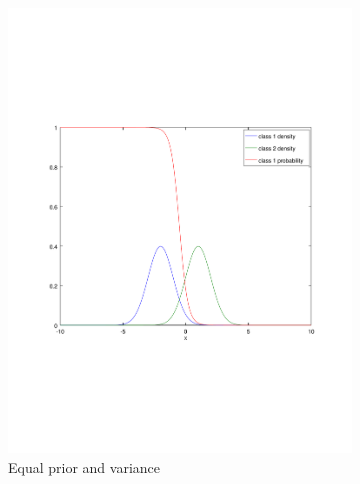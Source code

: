 \begin{frame}
\begin{figure}[H]
\begin{subfigure}{\fwidth}
      \includegraphics[width=\textwidth]{../figures/equal-variance}
      \caption{Equal prior and variance}
    \end{subfigure}
    \begin{subfigure}{\fwidth}

\end{subfigure}
\end{figure}
\end{frame}
